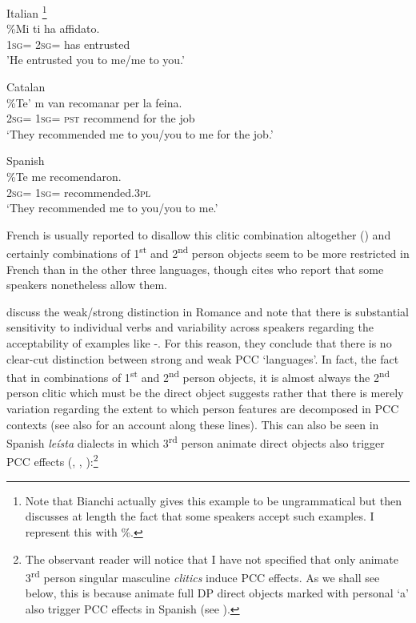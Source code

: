 \documentclass[output=paper,colorlinks,citecolor=brown,nonflat]{langsci/langscibook}
\begin{document}
\ea%
    \label{ex:sheehan:5}
    Italian \citep[2027]{Bianchi2006}\footnote{Note that Bianchi actually gives this example to be ungrammatical but then discusses at length the fact that some speakers accept such examples. I represent this with \%.}\\
    \gll    \%Mi   ti     ha   affidato.\\
            \textsc{1sg}=  \textsc{2sg=}   has   entrusted\\
    \glt    'He entrusted you to me/me to you.’
\z

\ea%
    \label{ex:sheehan:6}
    Catalan \citep[179]{Bonet1991}\\
    \gll    \%Te’  m   van   recomanar   per   la   feina.\\
            \textsc{2sg=}  \textsc{1sg}=   \textsc{pst}   recommend  for   the   job\\
    \glt    ‘They recommended me to you/you to me for the job.’
\z

\ea%
    \label{ex:sheehan:7}
    Spanish \citep[61]{Perlmutter1971}\\
    \gll    \%Te   me   recomendaron.\\
            \textsc{2sg}=  \textsc{1sg}=   recommended.\textsc{3pl}\\
    \glt    ‘They recommended me to you/you to me.’
\z

French is usually reported to disallow this clitic combination altogether (\citealt{Kayne1975, Quicoli1984}) and certainly combinations of 1\textsuperscript{st} and 2\textsuperscript{nd} person objects seem to be more restricted in French than in the other three languages, though \citet[180]{Bonet1991} cites \citet{SimpsonWithgott1986} who report that some speakers nonetheless allow them.

\citet{OrmazabalRomero2007} discuss the weak/strong distinction in Romance and note that there is substantial sensitivity to individual verbs and variability across speakers regarding the acceptability of examples like -. For this reason, they conclude that there is no clear-cut distinction between strong and weak PCC ‘languages’. In fact, the fact that in combinations of 1\textsuperscript{st} and 2\textsuperscript{nd} person objects, it is almost always the 2\textsuperscript{nd} person clitic which must be the direct object suggests rather that there is merely variation regarding the extent to which person features are decomposed in PCC contexts (see also \citealt{Anagnostopoulou2005} for an account along these lines). This can also be seen in Spanish \textit{leísta} dialects in which 3\textsuperscript{rd} person animate direct objects also trigger PCC effects (\citealt{OrmazabalRomero2007}, \citeyear{OrmazabalRomero2010}, \citeyear{OrmazabalRomero2013Borealis}):\footnote{The observant reader will notice that I have not specified that only animate 3\textsuperscript{rd} person singular masculine \textit{clitics} induce PCC effects. As we shall see below, this is because animate full DP direct objects marked with personal ‘a’ also trigger PCC effects in Spanish (see \citealt{OrmazabalRomero2013Borealis}).}
\end{document}
